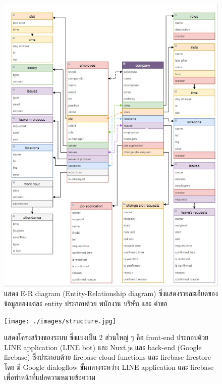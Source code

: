 \begin{figure}
\begin{center}
\includegraphics[width=14cm,keepaspectratio]{./images/penhwang_db_schema.jpg}
\end{center}
\caption[Poem]{แสดง E-R diagram (Entity-Relationship diagram) ซึ่งแสดงรายละเอียดของข้อมูลของแต่ละ entity ประกอบด้วย พนักงาน บริษัท และ คำขอ}
\end{figure}

\begin{figure}
\begin{center}
\texttt{[image: ./images/structure.jpg]}
\end{center}
\caption[Poem]{
  แสดงโครงสร้างของระบบ ซึ่งแบ่งเป็น 2 ส่วนใหญ่ ๆ คือ 
  front-end ประกอบด้วย LINE application (LINE bot) และ Nuxt.js 
  และ back-end (Google firebase) ซึ่งประกอบด้วย firebase cloud functions และ firebase firestore 
  โดย มี Google dialogflow ขั้นกลางระหว่าง LINE application และ firebase เพื่อทำหน้าที่แปลความหมายข้อความ
}
\end{figure}